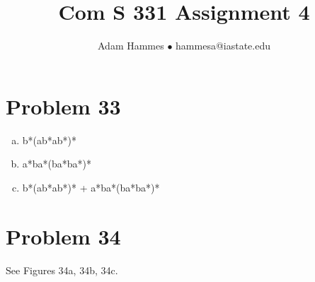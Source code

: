 \documentclass[11pt]{article}
\begin{document}
\title{Com S 331 Assignment 4}
\author{Adam Hammes $\bullet$ hammesa@iastate.edu }
\maketitle

\section*{Problem 33}

\begin{enumerate}[(a)]
	\item b*(ab*ab*)*
	\item a*ba*(ba*ba*)*
	\item b*(ab*ab*)* + a*ba*(ba*ba*)*

\end{enumerate}

\section*{Problem 34}

See Figures 34a, 34b, 34c.
\end{document}
